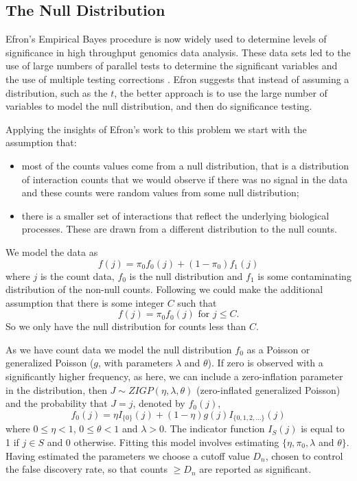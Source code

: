 \documentclass[authoryear,preprint,12pt,3p]{elsarticle}
\begin{document}
\subsection{The Null Distribution}

Efron's Empirical Bayes procedure \cite[]{efronLargeScaleInferenceEmpirical2010} is now widely used to determine levels of significance in
high throughput genomics data analysis.  These data sets led to the use of large numbers of parallel tests to determine the significant
variables and the use of multiple testing corrections \cite{limma.2015}.  Efron suggests that instead of assuming a distribution, such as
the $t$, the better approach is to use the large number of variables to model the null distribution, and then do significance testing.


Applying the insights of Efron's work to this problem we start with the assumption that:
\begin{itemize}
\item most of the counts values come from a null distribution, that is a distribution of interaction
  counts that we would observe if there was no signal in the data and these counts were random values from some null distribution;
\item there is a smaller set of interactions that reflect the underlying biological processes. These are drawn from a
  different distribution to the null counts.
\end{itemize}

We model the data as 
\[
f (j ) = \pi_0 f_0 (j ) + (1 - \pi_0 )f_1 (j )
\]
where $j$ is the count data, $f_0$ is the null distribution and $f_1$ is some contaminating distribution of the
non-null counts. Following \cite{Gauran.et.al.2018} we could make the additional assumption that there is some integer $C$ such that
\begin{equation}
  f(j ) = \pi_0 f_0 (j ) \textrm{ for } j \leq C.
\label{eqn:C}  
\end{equation}
So we only have the null distribution for counts less than $C.$ 

As we have count data we model the null distribution $f_0$ as a Poisson or  generalized Poisson ($g$, with parameters
$\lambda$ and $\theta$).
If zero is observed with a significantly higher frequency, as here, we can include a zero-inflation parameter in the
distribution, then $J \sim ZIGP(\eta, \lambda, \theta)$ (zero-inflated generalized Poisson) and the probability that $J = j$, denoted by $f_0 (j)$, 
\[
  f_0(j) = \eta I_{\{0\}} (j) + (1 - \eta) g(j) I_{\{0,1,2,\ldots \}} (j)
\]
where $0 \leq \eta < 1$, $0 \leq \theta < 1$ and $\lambda > 0$. The indicator function
$I_S (j)$ is equal to 1 if $j \in  S$ and 0 otherwise. Fitting this model involves estimating $\{ \eta, \pi_0,
\lambda$ and $\theta \}$. Having estimated the parameters we choose a cutoff value $D_n$, chosen to control the false
discovery rate, so that counts $\geq  D_n$ are reported as significant.
\end{document}
